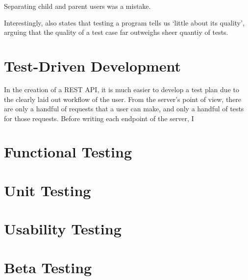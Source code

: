 Separating child and parent users was a mistake.

Interestingly, \cite{4597151} also states that testing a program tells us `little about its quality', arguing that the quality of a test case far outweighs sheer quantiy of tests.

\section{Test-Driven Development}
In the creation of a REST API, it is much easier to develop a test plan due to the clearly laid out workflow of the user. From the server's point of view, there are only a handful of requests that a user can make, and only a handful of tests for those requests. Before writing each endpoint of the server, I 

\section{Functional Testing}

\section{Unit Testing}

\section{Usability Testing}

\section{Beta Testing}